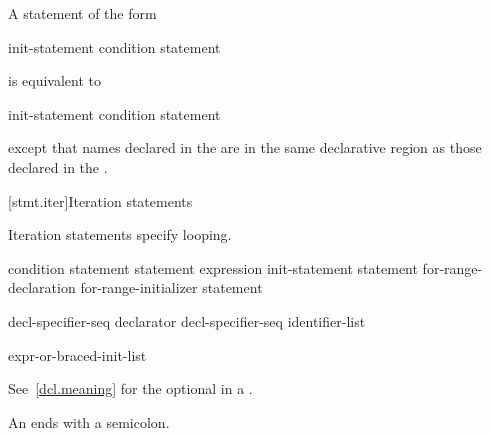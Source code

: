 \pnum
A  statement of the form
\begin{ncsimplebnf}
 \terminal{(} init-statement condition \terminal{)} statement
\end{ncsimplebnf}
is equivalent to
\begin{ncsimplebnf}
\terminal{\{}\br
\bnfindent init-statement\br
\bnfindent {} \terminal{(} condition \terminal{)} statement\br
\terminal{\}}
\end{ncsimplebnf}
except that names declared in the  are in
the same declarative region as those declared in the
.%

[stmt.iter]{Iteration statements}%

\pnum
Iteration statements specify looping.

%
%
%
%
\begin{bnf}
\br
     \terminal{(} condition \terminal{)} statement\br
     statement  \terminal{(} expression \terminal{)} \terminal{;}\br
     \terminal{(} init-statement  \terminal{;}  \terminal{)} statement\br
     \terminal{(}  for-range-declaration \terminal{:} for-range-initializer \terminal{)} statement
\end{bnf}

\begin{bnf}
\br
     decl-specifier-seq declarator\br
     decl-specifier-seq  \terminal{[} identifier-list \terminal{]}
\end{bnf}

\begin{bnf}
\br
    expr-or-braced-init-list
\end{bnf}

See~\ref{dcl.meaning} for the optional  in a
.
\begin{note}
An  ends with a semicolon.
\end{note}

